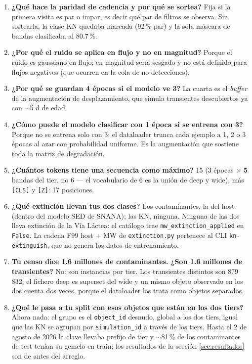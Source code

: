 \documentclass[11pt,a4paper]{article}
\newcommand{\code}[1]{\texttt{\small #1}}
\begin{document}
\begin{enumerate}[itemsep=3pt]
\item \textbf{¿Qué hace la paridad de cadencia y por qué se sortea?}
      Fija si la primera visita es par o impar, es decir qué par de filtros se observa. Sin
      sortearla, la clase KN quedaba marcada (92\,\% par) y la sola máscara de bandas clasificaba al
      80.7\,\%.

\item \textbf{¿Por qué el ruido se aplica en flujo y no en magnitud?}
      Porque el ruido es gaussiano en flujo; en magnitud sería sesgado y no está definido para
      flujos negativos (que ocurren en la cola de no-detecciones).

\item \textbf{¿Por qué se guardan 4 épocas si el modelo ve 3?}
      La cuarta es el \emph{buffer} de la augmentación de desplazamiento, que simula transientes
      descubiertos ya con $\sim$5 d de edad.

\item \textbf{¿Cómo puede el modelo clasificar con 1 época si se entrena con 3?}
      Porque no se entrena solo con 3: el dataloader trunca cada ejemplo a 1, 2 o 3 épocas al azar
      con probabilidad uniforme. Es la augmentación que sostiene toda la matriz de degradación.

\item \textbf{¿Cuántos tokens tiene una secuencia como máximo?}
      15 ($3$ épocas $\times$ \textbf{5} bandas del tier, no 6 --- el vocabulario de 6 es la unión de
      deep y wide), más \code{[CLS]} y \code{[Z]}: 17 posiciones.

\item \textbf{¿Qué extinción llevan tus dos clases?}
      Los contaminantes, la del host (dentro del modelo SED de SNANA); las KN, ninguna. Ninguna de
      las dos lleva extinción de la Vía Láctea: el catálogo trae \code{mw\_extinction\_applied} en
      \code{False}. La cadena F99 host $+$ MW de \code{extinction.py} pertenece al CLI
      \code{kn-extinguish}, que no genera los datos de entrenamiento.

\item \textbf{Tu censo dice 1.6 millones de contaminantes. ¿Son 1.6 millones de transientes?}
      No: son instancias por tier. Los transientes distintos son 879\,832; el fichero deep es
      superset del wide y un mismo objeto observado en los dos cuenta dos veces, porque el
      dataloader los trata como objetos separados.

\item \textbf{¿Qué le pasa a tu split con esos objetos que están en los dos tiers?}
      Ahora nada: el grupo es el \code{object\_id} desnudo, global a los dos tiers, igual que las
      KN se agrupan por \code{simulation\_id} a través de los tiers. Hasta el 2 de agosto de 2026 la
      clave llevaba prefijo de tier y $\sim$81\,\% de los contaminantes de test tenían su gemelo en
      train; los resultados de la sección \ref{sec:resultados} son de antes del arreglo.


\end{enumerate}
\end{document}

